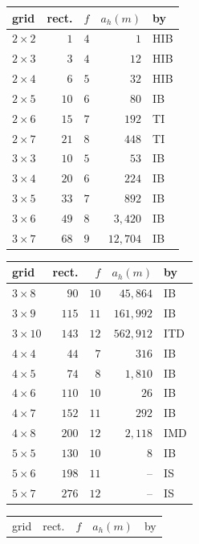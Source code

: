 \begin{table}[!htb]
\centering\scriptsize
\begin{tabular}{@{}lrrrl@{}}
\toprule
grid & rect. & $f$ & $a_h(m)$ & by \\
\midrule
$2\times2$ & $1$ & $4$ & $1$ & HIB \\
$2\times3$ & $3$ & $4$ & $12$ & HIB \\
$2\times4$ & $6$ & $5$ & $32$ & HIB \\
$2\times5$ & $10$ & $6$ & $80$ & IB \\
$2\times6$ & $15$ & $7$ & $192$ & TI \\
$2\times7$ & $21$ & $8$ & $448$ & TI \\
$3\times3$ & $10$ & $5$ & $53$ & IB \\
$3\times4$ & $20$ & $6$ & $224$ & IB \\
$3\times5$ & $33$ & $7$ & $892$ & IB \\
$3\times6$ & $49$ & $8$ & $3{,}420$ & IB \\
$3\times7$ & $68$ & $9$ & $12{,}704$ & IB \\
\bottomrule
\end{tabular}\hspace{0.6em}
\begin{tabular}{@{}lrrrl@{}}
\toprule
grid & rect. & $f$ & $a_h(m)$ & by \\
\midrule
$3\times8$ & $90$ & $10$ & $45{,}864$ & IB \\
$3\times9$ & $115$ & $11$ & $161{,}992$ & IB \\
$3\times10$ & $143$ & $12$ & $562{,}912$ & ITD \\
$4\times4$ & $44$ & $7$ & $316$ & IB \\
$4\times5$ & $74$ & $8$ & $1{,}810$ & IB \\
$4\times6$ & $110$ & $10$ & $26$ & IB \\
$4\times7$ & $152$ & $11$ & $292$ & IB \\
$4\times8$ & $200$ & $12$ & $2{,}118$ & IMD \\
$5\times5$ & $130$ & $10$ & $8$ & IB \\
$5\times6$ & $198$ & $11$ & -- & IS \\
$5\times7$ & $276$ & $12$ & -- & IS \\
\bottomrule
\end{tabular}\hspace{0.6em}
\begin{tabular}{@{}lrrrl@{}}
\toprule
grid & rect. & $f$ & $a_h(m)$ & by \\

\end{tabular}
\end{table}
